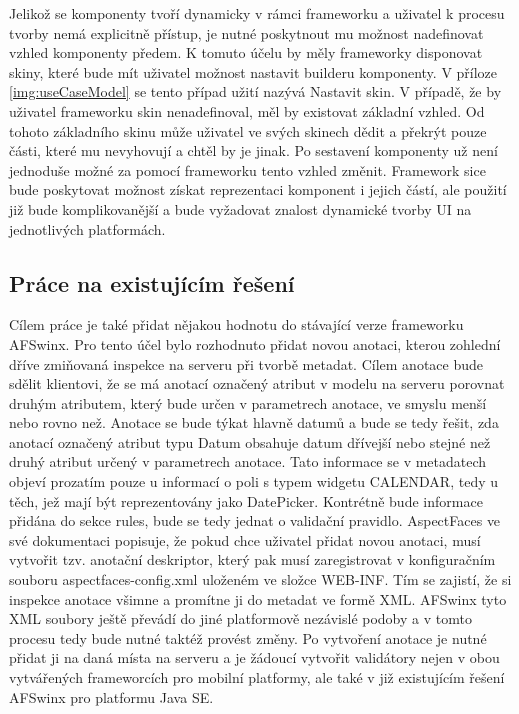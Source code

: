 Jelikož se komponenty tvoří dynamicky v rámci frameworku a uživatel k procesu tvorby nemá explicitně přístup, je nutné poskytnout mu možnost nadefinovat vzhled komponenty předem. K tomuto účelu by měly frameworky disponovat skiny, které bude mít uživatel možnost nastavit builderu komponenty. V příloze \ref{img:useCaseModel} se tento případ užití nazývá Nastavit skin. V případě, že by uživatel frameworku skin nenadefinoval, měl by existovat základní vzhled. Od tohoto základního skinu může uživatel ve svých skinech dědit a překrýt pouze části, které mu nevyhovují a chtěl by je jinak. Po sestavení komponenty už není jednoduše možné za pomocí frameworku tento vzhled změnit. Framework sice bude poskytovat možnost získat reprezentaci komponent i jejich částí, ale použití již bude komplikovanější a bude vyžadovat znalost dynamické tvorby UI na jednotlivých platformách.

\subsection{Práce na existujícím řešení}
Cílem práce je také přidat nějakou hodnotu do stávající verze frameworku AFSwinx. Pro tento účel bylo rozhodnuto přidat novou anotaci, kterou zohlední dříve zmiňovaná inspekce na serveru při tvorbě metadat. Cílem anotace bude sdělit klientovi, že se má anotací označený atribut v modelu na serveru porovnat druhým atributem, který bude určen v parametrech anotace, ve smyslu menší nebo rovno než. Anotace se bude týkat hlavně datumů a bude se tedy řešit, zda anotací označený atribut typu Datum obsahuje datum dřívejší nebo stejné než druhý atribut určený v parametrech anotace. Tato informace se v metadatech objeví prozatím pouze u informací o poli s typem widgetu CALENDAR, tedy u těch, jež mají být reprezentovány jako DatePicker. Kontrétně bude informace přidána do sekce rules, bude se tedy jednat o validační pravidlo. AspectFaces \cite{aspect-faces} ve své dokumentaci popisuje, že pokud chce uživatel přidat novou anotaci, musí vytvořit tzv. anotační deskriptor, který pak musí zaregistrovat v konfiguračním souboru aspectfaces-config.xml uloženém ve složce WEB-INF. Tím se zajistí, že si inspekce anotace všimne a promítne ji do metadat ve formě XML. AFSwinx tyto XML soubory ještě převádí do jiné platformově nezávislé podoby \cite{tomasek-thesis} a v tomto procesu tedy bude nutné taktéž provést změny. Po vytvoření anotace je nutné přidat ji na daná místa na serveru a je žádoucí vytvořit validátory nejen v obou vytvářených frameworcích pro mobilní platformy, ale také v již existujícím řešení AFSwinx pro platformu Java SE.



